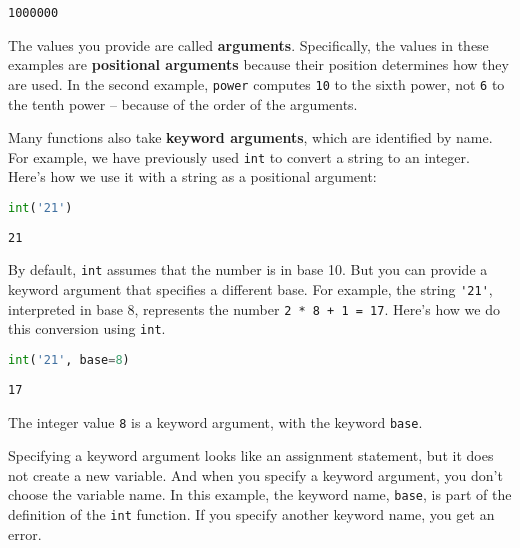 \begin{lstlisting}[style=output]
1000000
\end{lstlisting}

The values you provide are called \textbf{arguments}. Specifically, the
values in these examples are \textbf{positional arguments} because their
position determines how they are used. In the second example,
\passthrough{\lstinline!power!} computes \passthrough{\lstinline!10!} to
the sixth power, not \passthrough{\lstinline!6!} to the tenth power --
because of the order of the arguments.

Many functions also take \textbf{keyword arguments}, which are
identified by name. For example, we have previously used
\passthrough{\lstinline!int!} to convert a string to an integer. Here's
how we use it with a string as a positional argument:

\begin{lstlisting}[language=Python,style=source]
int('21')
\end{lstlisting}

\begin{lstlisting}[style=output]
21
\end{lstlisting}

By default, \passthrough{\lstinline!int!} assumes that the number is in
base 10. But you can provide a keyword argument that specifies a
different base. For example, the string \passthrough{\lstinline!'21'!},
interpreted in base 8, represents the number
\passthrough{\lstinline!2 * 8 + 1 = 17!}. Here's how we do this
conversion using \passthrough{\lstinline!int!}.

\begin{lstlisting}[language=Python,style=source]
int('21', base=8)
\end{lstlisting}

\begin{lstlisting}[style=output]
17
\end{lstlisting}

The integer value \passthrough{\lstinline!8!} is a keyword argument,
with the keyword \passthrough{\lstinline!base!}.

Specifying a keyword argument looks like an assignment statement, but it
does not create a new variable. And when you specify a keyword argument,
you don't choose the variable name. In this example, the keyword name,
\passthrough{\lstinline!base!}, is part of the definition of the
\passthrough{\lstinline!int!} function. If you specify another keyword
name, you get an error.

